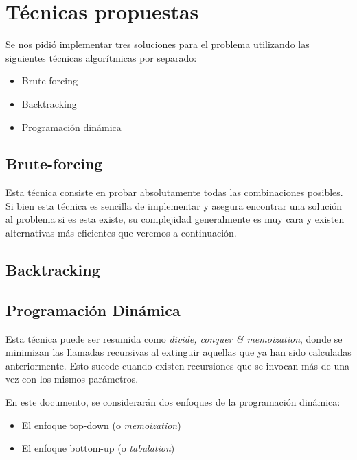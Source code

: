\section{Técnicas propuestas}
Se nos pidió implementar tres soluciones para el problema utilizando las siguientes técnicas algorítmicas por separado:
\begin{itemize}
	\item Brute-forcing
	\item Backtracking
	\item Programación dinámica
\end{itemize}

\subsection{Brute-forcing}
Esta técnica consiste en probar absolutamente todas las combinaciones posibles. Si bien esta técnica es sencilla de implementar y asegura encontrar una solución al problema si es esta existe, su complejidad generalmente es muy cara y existen alternativas más eficientes que veremos a continuación.

\subsection{Backtracking}

\subsection{Programación Dinámica}
Esta técnica puede ser resumida como \textit{divide, conquer \& memoization}, donde se minimizan las llamadas recursivas al extinguir aquellas que ya han sido calculadas anteriormente. Esto sucede cuando existen recursiones que se invocan más de una vez con los mismos parámetros.

\vskip 8pt

En este documento, se considerarán dos enfoques de la programación dinámica:
\begin{itemize}
	\item El enfoque top-down (o \textit{memoization})
	\item El enfoque bottom-up (o \textit{tabulation})
\end{itemize}